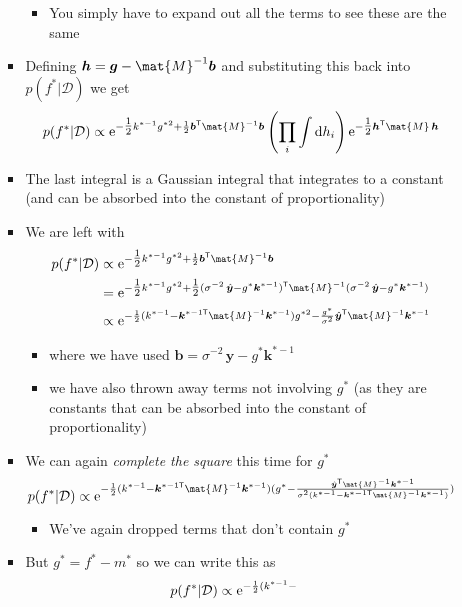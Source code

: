 \documentclass[11pt]{article}
\newcommand{\tr}{\textsf{T}}
\newcommand{\e}[1]{{\rm e}^{#1}}
\newcommand{\dd}{\mathrm{d}}
\begin{document}
\begin{itemize}
\begin{itemize}
\begin{itemize}
\begin{itemize}
\item You simply have to expand out all the terms to see these
are the same
\end{itemize}
\item Defining \(\bm{h} = \bm{g} - \mat{M}^{-1}\bm{b}\) and
substituting this back into  \(p(f^*|\mathcal{D})\) we get
$$ p(f^*|\mathcal{D}) \propto \e{-\tfrac{1}{2} k^{*-1}g^{*2}+
         \frac{1}{2} \bm{b}^\tr \mat{M}^{-1}\bm{b} }
         \left(\prod_i \int  \dd h_i\right) \e{-\tfrac{1}{2}
         \bm{h}^\tr\mat{M}\, \bm{h}} $$
\item The last integral is a Gaussian integral that integrates to a
constant (and can be absorbed into the constant of proportionality)
\item We are left with
 \begin{align*}
 p(f^*|\mathcal{D}) &\propto \e{-\tfrac{1}{2} k^{*-1}g^{*2}+
 \frac{1}{2} \bm{b}^\tr \mat{M}^{-1}\bm{b}} \\
 &= \e{-\tfrac{1}{2} k^{*-1}g^{*2}+ \tfrac{1}{2}
 (\sigma^{-2}\, \hat{\bm{y}} - g^* \bm{k}^{*-1})^\tr
 \mat{M}^{-1}
 (\sigma^{-2}\, \hat{\bm{y}} - g^* \bm{k}^{*-1})}\\
& \propto \e{-\frac{1}{2}(k^{*-1} - \bm{k}^{*-1\tr}
\mat{M}^{-1} \bm{k}^{*-1}) g^{*2}
 - \frac{g^*}{\sigma^2} \hat{\bm{y}}^\tr \mat{M}^{-1} \bm{k}^{*-1}}
 \end{align*}
\begin{itemize}
\item where we have used \(\bm{b}=\sigma^{-2}\, \hat{\bm{y}} - g^*
           \bm{k}^{*-1}\)
\item we have also thrown away terms not involving \(g^*\) (as they
are constants that can be absorbed into the constant of proportionality)
\end{itemize}
\item We can again \emph{complete the square} this time for \(g^*\)
$$ p(f^*|\mathcal{D}) \propto \e{-\frac{1}{2}(k^{*-1} - \bm{k}^{*-1\tr}     \mat{M}^{-1} \bm{k}^{*-1}) (g^{*}- \frac{\hat{\bm{y}}^\tr \mat{M}^{-1} \bm{k}^{*-1}}{\sigma^2(k^{*-1} - \bm{k}^{*-1\tr}  \mat{M}^{-1} \bm{k}^{*-1})})} $$
\begin{itemize}
\item We've again dropped terms that don't contain \(g^*\)
\end{itemize}
\item But \(g^*=f^*-m^*\) so we can write this as
\begin{align*}
p(f^*|\mathcal{D}) &\propto \e{-\frac{1}{2}(k^{*-1} -
}
\end{align*}
\end{itemize}
\end{itemize}
\end{itemize}
\end{document}
